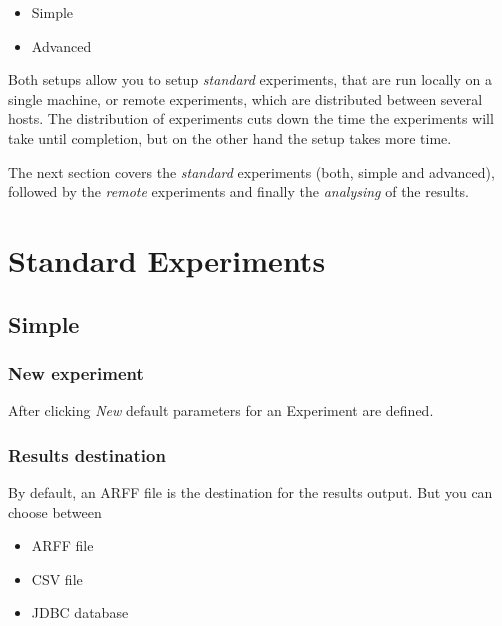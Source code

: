 \begin{itemize}
	\item Simple
	\item Advanced 
\end{itemize}

Both setups allow you to setup \textit{standard} experiments, that are run locally on a single machine, or remote experiments, which are distributed between several hosts. The distribution of experiments cuts down the time the experiments will take until completion, but on the other hand the setup takes more time.

The next section covers the \textit{standard} experiments (both, simple and advanced), followed by the \textit{remote} experiments and finally the \textit{analysing} of the results.



\newpage
\section{Standard Experiments}


\subsection{Simple}

\subsubsection{New experiment}

After clicking \textit{New} default parameters for an Experiment are defined.

\begin{center}
\end{center}


\subsubsection{Results destination}

By default, an ARFF file is the destination for the results output. But you can choose between

\begin{itemize}
	\item ARFF file
   \item CSV file
   \item JDBC database 
\end{itemize}

